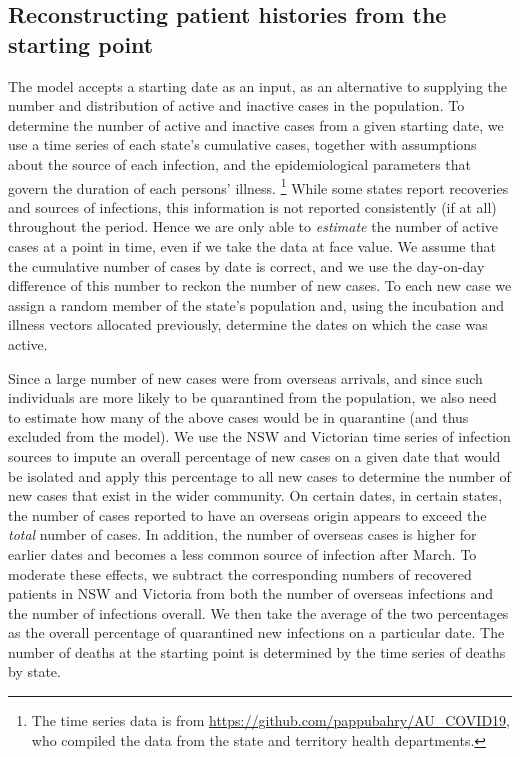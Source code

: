 \documentclass[submission]{grattan}
\begin{document}
\subsection{Reconstructing patient histories from the starting point}
The model accepts a starting date as an input, as an alternative to supplying the
number and distribution of active and inactive cases in the population.
 To determine the number of active and inactive cases from a given starting date,
 we use a time series of each state's cumulative cases, together with assumptions
 about the source of each infection, and the epidemiological parameters that govern
 the duration of each persons' illness.%
 	\footnote{The time series data is from \url{https://github.com/pappubahry/AU_COVID19}, who
 	compiled the data from the state and territory health departments.}
 While some states
 	report recoveries and sources of infections, this information is not reported consistently
 	 (if at all) throughout the period.
Hence we are only able to \emph{estimate} the number of active cases at a point in time,
even if we take the data at face value. We assume that the cumulative number of cases
by date is correct, and we use the day-on-day difference of this number to reckon the
number of new cases. To each new case we assign a random member of the state's population and,
using the incubation and illness vectors allocated previously, determine the dates on which
the case was active.

Since a large number of new cases were from overseas arrivals, and since such individuals are more
likely to be quarantined from the population, we also need to estimate how many of the
above cases would be in quarantine (and thus excluded from the model). We use the NSW and
Victorian time series of infection sources to impute an overall percentage of new cases
on a given date that would be isolated and apply this percentage to all new cases to
determine the number of new cases that exist in the wider community. On certain dates,
in certain states,
the number of cases reported to have an overseas origin appears to exceed the \emph{total}
number of cases. In addition, the number of overseas cases is higher for earlier dates and
becomes a less common source of infection after March. To moderate these effects, we subtract
the corresponding numbers of recovered patients in NSW and Victoria from both the number of
overseas infections and the number of infections overall. We then take the average of the
two percentages as the overall percentage of quarantined new infections on a particular date.
The number of deaths at the starting point is determined by the time series of deaths by state.
\end{document}
